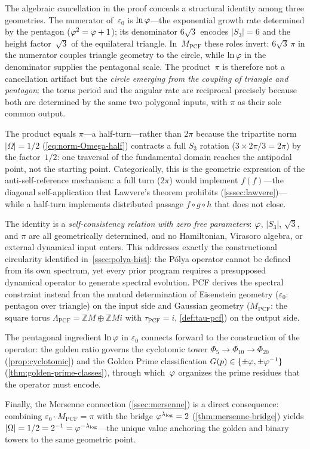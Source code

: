 \begin{Remark}\label{rem:certainty-content}
The algebraic cancellation in the proof conceals a structural identity
among three geometries.  The numerator of~$\varepsilon_0$ is
$\ln\varphi$---the exponential growth rate determined by the
pentagon ($\varphi^2=\varphi+1$); its denominator $6\sqrt{3}$ encodes
$|S_3|=6$ and the height factor~$\sqrt{3}$ of the equilateral
triangle.  In~$M_{\mathrm{PCF}}$ these roles invert:
$6\sqrt{3}\,\pi$ in the numerator couples triangle geometry to the
circle, while $\ln\varphi$ in the denominator supplies the pentagonal
scale.  The product~$\pi$ is therefore not a cancellation artifact
but the \emph{circle emerging from the coupling of triangle and
pentagon}: the torus period and the angular rate are reciprocal
precisely because both are determined by the same two polygonal
inputs, with $\pi$ as their sole common output.

The product equals $\pi$---a half-turn---rather than $2\pi$ because
the tripartite norm $|\Omega|=1/2$
(\cref{eq:norm-Omega-half}) contracts a full $S_3$ rotation
($3\times 2\pi/3=2\pi$) by the factor~$1/2$: one traversal of the
fundamental domain reaches the antipodal point, not the starting
point.  Categorically, this is the geometric expression of the
anti-self-reference mechanism: a full turn ($2\pi$) would implement
$f(f)$---the diagonal self-application that Lawvere's theorem
prohibits (\cref{sssec:lawvere})---while a half-turn implements
distributed passage $f\circ g\circ h$ that does not close.

The identity is a \emph{self-consistency relation with zero free
parameters}: $\varphi$, $|S_3|$, $\sqrt{3}$, and $\pi$ are all
geometrically determined, and no Hamiltonian, Virasoro algebra, or
external dynamical input enters.  This addresses exactly the
constructional circularity identified in~\cref{ssec:polya-hist}:
the P\'olya operator cannot be defined from its own spectrum, yet
every prior program requires a presupposed dynamical operator to
generate spectral evolution.  PCF derives the spectral constraint
instead from the mutual determination of Eisenstein geometry
($\varepsilon_0$: pentagon over triangle) on the input side and
Gaussian geometry ($M_{\mathrm{PCF}}$: the square torus
$\Lambda_{\mathrm{PCF}} = \mathbb{Z}M\oplus\mathbb{Z}Mi$ with
$\tau_{\mathrm{PCF}}=i$, \cref{def:tau-pcf}) on the
output side.

The pentagonal ingredient $\ln\varphi$ in $\varepsilon_0$ connects
forward to the construction of the operator: the golden ratio governs
the cyclotomic tower
$\Phi_5\to\Phi_{10}\to\Phi_{20}$
(\cref{prop:cyclotomic}) and the Golden Prime
classification $G(p)\in\{\pm\varphi,\pm\varphi^{-1}\}$
(\cref{thm:golden-prime-classes}), through which~$\varphi$
organizes the prime residues that the operator must encode.

Finally, the Mersenne connection (\cref{ssec:mersenne}) is a
direct consequence: combining $\varepsilon_0\cdot M_{\mathrm{PCF}}=\pi$
with the bridge $\varphi^{\lambda_{\log}}=2$
(\cref{thm:mersenne-bridge}) yields
$|\Omega|=1/2=2^{-1}=\varphi^{-\lambda_{\log}}$---the unique value
anchoring the golden and binary towers to the same geometric point.
\end{Remark}

